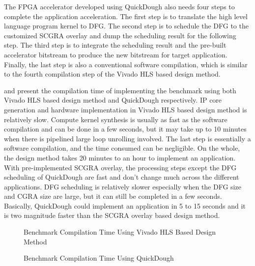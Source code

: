 The FPGA accelerator developed using QuickDough also needs four steps to complete the application acceleration. The first step is to translate the high level language program kernel to DFG. The second step is to schedule the DFG to the customized SCGRA overlay and dump the scheduling result for the following step. The third step is to integrate the scheduling result and the pre-built accelerator bitstream to produce the new bitstream for target application. Finally, the last step is also a conventional software compilation, which is similar to the fourth compilation step of the Vivado HLS based design method. 

 and  present the compilation time of implementing the benchmark using both Vivado HLS based design method and QuickDough respectively. IP core generation and hardware implementation in Vivado HLS based design method is relatively slow. Compute kernel synthesis is usually as fast as the software compilation and can be done in a few seconds, but it may take up to 10 minutes when there is pipelined large loop unrolling involved. The last step is essentially a software compilation, and the time consumed can be negligible. On the whole, the design method takes 20 minutes to an hour to implement an application. With pre-implemented SCGRA overlay, the processing steps except the DFG scheduling of QuickDough are fast and don't change much across the different applications. DFG scheduling is relatively slower especially when the DFG size and CGRA size are large, but it can still be completed in a few seconds. Basically, QuickDough could implement an application in 5 to 15 seconds and it is two magnitude faster than the SCGRA overlay based design method. 

\begin{figure*}[t]
\caption{Benchmark Compilation Time Using Vivado HLS Based Design Method}
\label{fig:Vivado-HLS-Compilation-Time}
\end{figure*}

\begin{figure*}[t]
\caption{Benchmark Compilation Time Using QuickDough}
\label{fig:SCGRA-Overlay-Compilation-Time}
\end{figure*}


